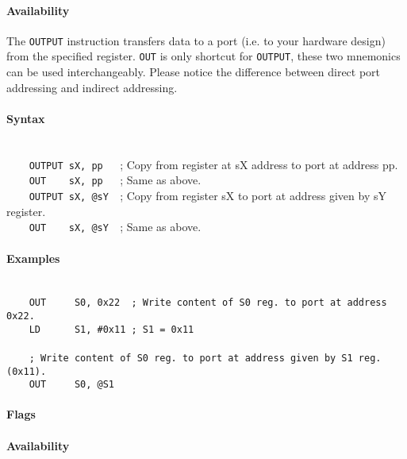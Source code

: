         \paragraph{Availability}
            \pbavailability{\yes}{\yes}{\yes}{\yes}{\yes}

    \clearpage
        The \texttt{OUTPUT} instruction transfers data to a port (i.e. to your hardware design) from the specified register. \texttt{OUT} is only shortcut for \texttt{OUTPUT}, these two mnemonics can be used interchangeably. Please notice the difference between direct port addressing and indirect addressing.

        \paragraph{Syntax}
            ~\\
            \verb'    OUTPUT sX, pp   '; Copy from register at sX address to port at address pp.\\
            \verb'    OUT    sX, pp   '; Same as above.\\
            \verb'    OUTPUT sX, @sY  '; Copy from register sX to port at address given by sY register.\\
            \verb'    OUT    sX, @sY  '; Same as above.

        \paragraph{Examples}
            ~\\
            \verb'    OUT     S0, 0x22  ; Write content of S0 reg. to port at address 0x22.'\\
            \verb'    LD      S1, #0x11 ; S1 = 0x11'\\
            \verb''\\
            \verb'    ; Write content of S0 reg. to port at address given by S1 reg. (0x11). '\\
            \verb'    OUT     S0, @S1'\\

        \paragraph{Flags}

        \paragraph{Availability}
            \pbavailability{\yes}{\yes}{\yes}{\yes}{\yes}

